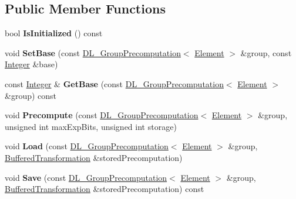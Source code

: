 \subsection*{Public Member Functions}
\begin{DoxyCompactItemize}
\item 
\hypertarget{class_d_l___base_precomputation___l_u_c_a1b5e60776479529ccc75443f2c1da73b}{
bool {\bfseries IsInitialized} () const }
\label{class_d_l___base_precomputation___l_u_c_a1b5e60776479529ccc75443f2c1da73b}

\item 
\hypertarget{class_d_l___base_precomputation___l_u_c_a6d865ec1833d0d4c5f30647ca7b2e9a7}{
void {\bfseries SetBase} (const \hyperlink{class_d_l___group_precomputation}{DL\_\-GroupPrecomputation}$<$ \hyperlink{class_integer}{Element} $>$ \&group, const \hyperlink{class_integer}{Integer} \&base)}
\label{class_d_l___base_precomputation___l_u_c_a6d865ec1833d0d4c5f30647ca7b2e9a7}

\item 
\hypertarget{class_d_l___base_precomputation___l_u_c_aa28e2ea9a11e8b4dd119ca3395bb18d8}{
const \hyperlink{class_integer}{Integer} \& {\bfseries GetBase} (const \hyperlink{class_d_l___group_precomputation}{DL\_\-GroupPrecomputation}$<$ \hyperlink{class_integer}{Element} $>$ \&group) const }
\label{class_d_l___base_precomputation___l_u_c_aa28e2ea9a11e8b4dd119ca3395bb18d8}

\item 
\hypertarget{class_d_l___base_precomputation___l_u_c_a635c3728cec2a472716bbab2dc6bbe29}{
void {\bfseries Precompute} (const \hyperlink{class_d_l___group_precomputation}{DL\_\-GroupPrecomputation}$<$ \hyperlink{class_integer}{Element} $>$ \&group, unsigned int maxExpBits, unsigned int storage)}
\label{class_d_l___base_precomputation___l_u_c_a635c3728cec2a472716bbab2dc6bbe29}

\item 
\hypertarget{class_d_l___base_precomputation___l_u_c_a29ef2941ab5722671d60a35e5f11a357}{
void {\bfseries Load} (const \hyperlink{class_d_l___group_precomputation}{DL\_\-GroupPrecomputation}$<$ \hyperlink{class_integer}{Element} $>$ \&group, \hyperlink{class_buffered_transformation}{BufferedTransformation} \&storedPrecomputation)}
\label{class_d_l___base_precomputation___l_u_c_a29ef2941ab5722671d60a35e5f11a357}

\item 
\hypertarget{class_d_l___base_precomputation___l_u_c_a7e1569c896fdd5d3621970979e7daf93}{
void {\bfseries Save} (const \hyperlink{class_d_l___group_precomputation}{DL\_\-GroupPrecomputation}$<$ \hyperlink{class_integer}{Element} $>$ \&group, \hyperlink{class_buffered_transformation}{BufferedTransformation} \&storedPrecomputation) const }
\label{class_d_l___base_precomputation___l_u_c_a7e1569c896fdd5d3621970979e7daf93}


\end{DoxyCompactItemize}
